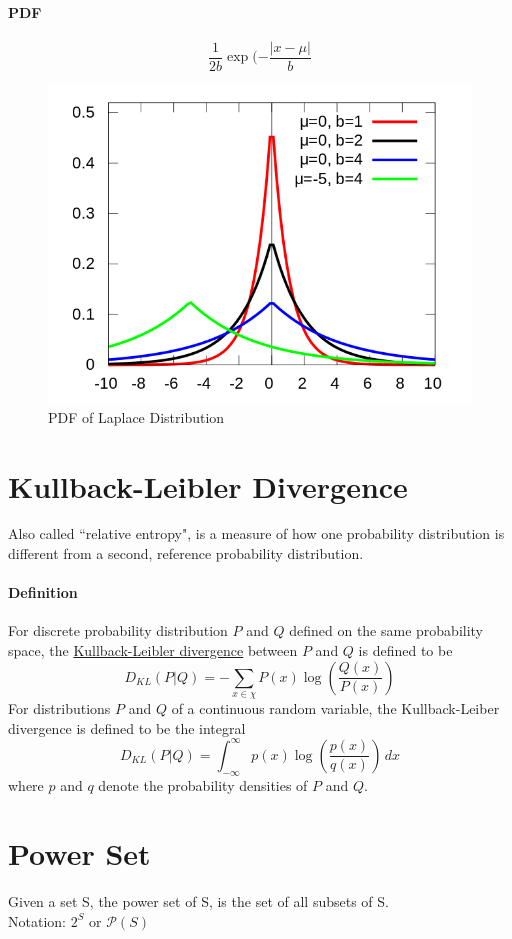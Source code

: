 \documentclass[11pt]{article}
\newcommand{\under}[1]{\underline{#1}}
\begin{document}
\paragraph{PDF}
$$\frac{1}{2b}\exp(-\frac{|x-\mu|}{b}$$
\begin{figure}[h]
	\centering
	\includegraphics[scale=0.3]{laplace.png}
	\caption{PDF of Laplace Distribution}
\end{figure}

\section{Kullback-Leibler Divergence}
Also called ``relative entropy", is a measure of how one probability distribution is different from a second, reference probability distribution.
\paragraph{Definition}
For discrete probability distribution $P$ and $Q$ defined on the same probability space, the \under{Kullback-Leibler divergence} between $P$ and $Q$ is defined to be
$$D_{KL}(P|Q) = - \sum_{x \in \chi} P(x)\log(\frac{Q(x)}{P(x)})$$
For distributions $P$ and $Q$ of a continuous random variable, the Kullback-Leiber divergence is defined to be the integral
$$D_{KL}(P|Q) = \int_{-\infty}^\infty p(x)\log(\frac{p(x)}{q(x)})\, dx$$ where $p$ and $q$ denote the probability densities of $P$ and $Q$.

\section{Power Set}
Given a set S, the power set of S, is the set of all subsets of S. \\
Notation: $2^S$ or $\mathcal{P}(S)$
\end{document}
